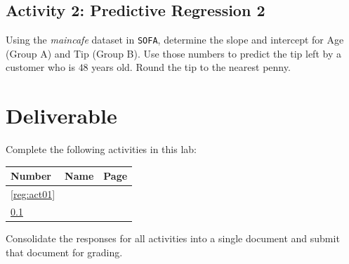\subsection{Activity 2: Predictive Regression 2} \label{reg:act02}

Using the \textit{maincafe} dataset in \texttt{SOFA}, determine the slope and intercept for Age (Group A) and Tip (Group B). Use those numbers to predict the tip left by a customer who is $ 48 $ years old. Round the tip to the nearest penny.

\section{Deliverable}

Complete the following activities in this lab:

\begin{center}
  \begin{tabular}{lll}
    \hline 
    \textbf{Number} & \textbf{Name} & \textbf{Page} \\ 
    \hline 
    \ref{reg:act01} & \nameref{reg:act01} & \pageref{reg:act01} \\ 
    \ref{reg:act02} & \nameref{reg:act02} & \pageref{reg:act02} \\ 
    \hline 
  \end{tabular} 
\end{center}

Consolidate the responses for all activities into a single document and submit that document for grading.

